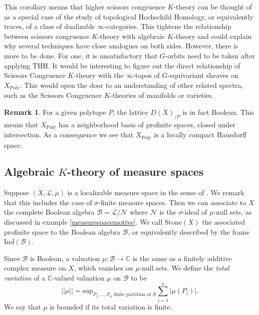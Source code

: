 \documentclass[10pt]{amsart}
\theoremstyle{definition}
\newtheorem{remark}[theorem]{Remark}
\begin{document}
This corollary means that higher scissors congruence $K$-theory can be thought of as a special case of the study of topological Hochschild Homology, or equivalently traces, of a class of dualizable $\infty$-categories. This tightens the relationship between scissors congruence $K$-theory with algebraic $K$-theory and could explain why several techniques have close analogues on both sides. However, there is more to be done. For one, it is unsatisfactory that $G$-orbits need to be taken after applying $\mathrm{THH}$. It would be interesting to figure out the direct relationship of Scissors Congruence $K$-theory with the $\infty$-topos of $G$-equivariant sheaves on $X_{\mathrm{Poly}}$. This would open the door to an understanding of other related spectra, such as the Scissors Congruence $K$-theories of manifolds or varieties.

\begin{remark}
For a given polytope $P$, the lattice $D(X)_{/P}$ is in fact Boolean. This means that $X_{\mathrm{Poly}}$ has a neighborhood basis of profinite spaces, closed under intersection. As a consequence we see that $X_{\mathrm{Poly}}$ is a locally compact Hausdorff space. 
\end{remark}

\subsection{Algebraic $K$-theory of measure spaces} \label{algebraicktheorymeasure}

Suppose $(X, \mathcal{L}, \mu)$ is a localizable measure space in the sense of \cite[Definition 211G]{fremlin2000measure}. We remark that this includes the case of $\sigma$-finite measure spaces.  Then we can associate to $X$ the complete Boolean algebra $\mathcal{B} = \mathcal{L}/\mathcal{N}$ where $\mathcal{N}$ is the $\sigma$-ideal of $\mu$-null sets, as discussed in example \ref{measurespacemotive}. We call $\mathrm{Stone}(X)$ the associated profinite space to the Boolean algebra $\mathcal{B}$, or equivalently described by the frame $\mathrm{Ind}(\mathcal{B})$.

Since $\mathcal{B}$ is Boolean, a valuation $\mu : \mathcal{B} \rightarrow \mathbb{C}$ is the same as a finitely additive complex measure on $X$, which vanishes on $\mu$-null sets. We define the \emph{total variation} of a $\mathbb{C}$-valued valuation $\mu$ on $\mathcal{B}$ to be
$$||\mu|| = \mathrm{sup}_{P_1,\hdots, P_n \text{ finite partition of } \mathcal{B}} \sum_{i = 1}^n |\mu(P_i)|.$$
We say that $\mu$ is bounded if its total variation is finite.
\end{document}
